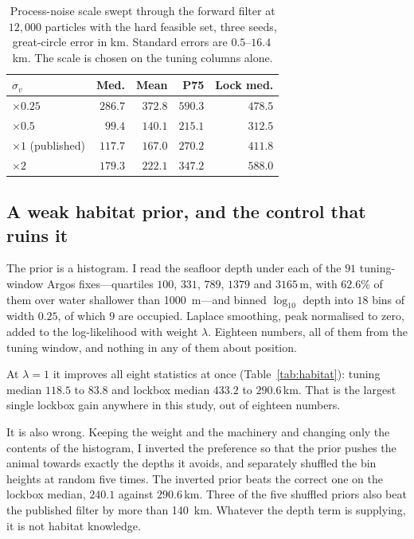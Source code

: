 \documentclass[conference]{IEEEtran}
\begin{document}
\begin{table}[t]
\caption{Process-noise scale swept through the forward filter at $12{,}000$
particles with the hard feasible set, three seeds, great-circle error in
\si{\km}. Standard errors are $0.5$--$16.4$\,\si{\km}. The scale is chosen on
the tuning columns alone.}
\label{tab:sigv}
\centering
\begin{tabular}{@{}lrrrr@{}}
\toprule
$\sigma_v$ & Med. & Mean & P75 & Lock med. \\
\midrule
$\times 0.25$          & $286.7$ & $372.8$ & $590.3$ & $478.5$ \\
$\times 0.5$           & $99.4$  & $140.1$ & $215.1$ & $312.5$ \\
$\times 1$ (published) & $117.7$ & $167.0$ & $270.2$ & $411.8$ \\
$\times 2$             & $179.3$ & $222.1$ & $347.2$ & $588.0$ \\
\bottomrule
\end{tabular}
\end{table}

\subsection{A weak habitat prior, and the control that ruins it}

The prior is a histogram. I read the seafloor depth under each of the $91$
tuning-window Argos fixes---quartiles $100$, $331$, $789$, $1379$ and
$3165$\,\si{\m}, with $62.6\%$ of them over water shallower than
\SI{1000}{\m}---and binned $\log_{10}$ depth into $18$ bins of width $0.25$, of
which $9$ are occupied. Laplace smoothing, peak normalised to zero, added to
the log-likelihood with weight $\lambda$. Eighteen numbers, all of them from
the tuning window, and nothing in any of them about position.

At $\lambda = 1$ it improves all eight statistics at once
(Table~\ref{tab:habitat}): tuning median $118.5$ to $83.8$ and lockbox median
$433.2$ to $290.6$\,\si{\km}. That is the largest single lockbox gain anywhere
in this study, out of eighteen numbers.

It is also wrong. Keeping the weight and the machinery and changing only the
contents of the histogram, I inverted the preference so that the prior pushes
the animal towards exactly the depths it avoids, and separately shuffled the
bin heights at random five times. The inverted prior beats the correct one on
the lockbox median, $240.1$ against $290.6$\,\si{\km}. Three of the five
shuffled priors also beat the published filter by more than \SI{140}{\km}.
Whatever the depth term is supplying, it is not habitat knowledge.
\end{document}
